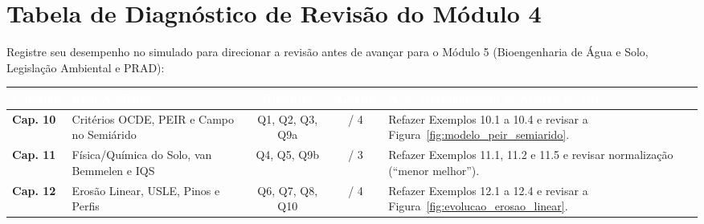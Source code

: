 \section*{Tabela de Diagnóstico de Revisão do Módulo 4}

Registre seu desempenho no simulado para direcionar a revisão antes de avançar para o Módulo 5 (Bioengenharia de Água e Solo, Legislação Ambiental e PRAD):

\begin{center}
\renewcommand{\arraystretch}{1.35}
\small
\begin{tabularx}{\textwidth}{@{}p{2.2cm} p{4.2cm} c c >{\raggedright\arraybackslash}X@{}}
  \toprule
  \rowcolor{uefsNavy}
  \textcolor{white}{\bfseries Capítulo} & \textcolor{white}{\bfseries Eixo Avaliado} & \textcolor{white}{\bfseries Questões} & \textcolor{white}{\bfseries Acertos} & \textcolor{white}{\bfseries Ação Recomendada se Abaixo de 70\%} \\
  \midrule
  \textbf{Cap. 10} & Critérios OCDE, PEIR e Campo no Semiárido & Q1, Q2, Q3, Q9a & \quad / 4 & Refazer Exemplos 10.1 a 10.4 e revisar a Figura~\ref{fig:modelo_peir_semiarido}. \\
  \rowcolor{bgGray}
  \textbf{Cap. 11} & Física/Química do Solo, van Bemmelen e IQS & Q4, Q5, Q9b & \quad / 3 & Refazer Exemplos 11.1, 11.2 e 11.5 e revisar normalização (``menor melhor''). \\
  \textbf{Cap. 12} & Erosão Linear, USLE, Pinos e Perfis & Q6, Q7, Q8, Q10 & \quad / 4 & Refazer Exemplos 12.1 a 12.4 e revisar a Figura~\ref{fig:evolucao_erosao_linear}. \\
  \bottomrule
\end{tabularx}
\end{center}
